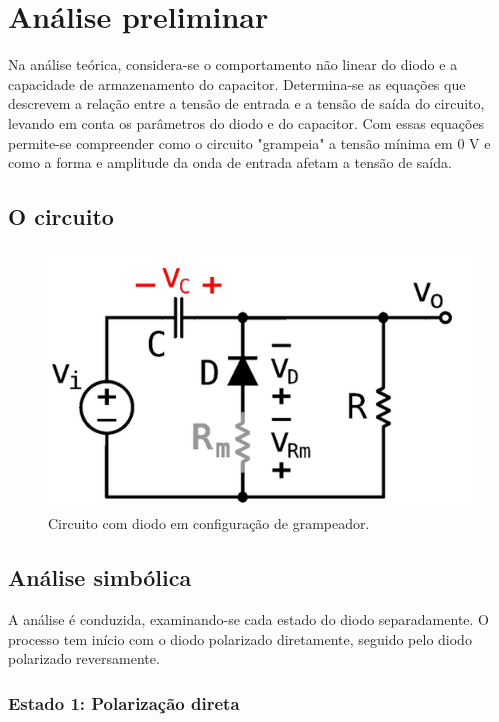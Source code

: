 \section{Análise preliminar}

Na análise teórica, considera-se o comportamento não linear do diodo e a capacidade de armazenamento do capacitor. Determina-se as equações que descrevem a relação entre a tensão de entrada e a tensão de saída do circuito, levando em conta os parâmetros do diodo e do capacitor. Com essas equações permite-se compreender como o circuito "grampeia" a tensão mínima em 0 V e como a forma e amplitude da onda de entrada afetam a tensão de saída.

\subsection{O circuito}

\begin{figure}[h]
    \centering
    \includegraphics[width=1\columnwidth]{images/o_circuito.png}
    \caption{Circuito com diodo em configuração de grampeador.}
\end{figure}

\newpage
\subsection{Análise simbólica}

A análise é conduzida, examinando-se cada estado do diodo separadamente. O processo tem início com o diodo polarizado diretamente, seguido pelo diodo polarizado reversamente.

\subsubsection{Estado 1: Polarização direta}

